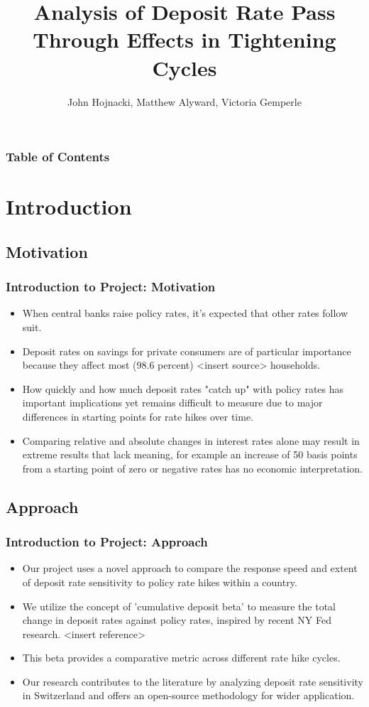 \documentclass{beamer}
\title{Analysis of Deposit Rate Pass Through Effects in Tightening Cycles}
\institute{University of Zurich}
\author{John Hojnacki, Matthew Alyward, Victoria Gemperle}
\begin{document}
\begin{frame}
\titlepage %
\end{frame}

\begin{frame}
\frametitle{Table of Contents}
\tableofcontents
\end{frame}

\section{Introduction}
\subsection{Motivation}
\begin{frame}
\frametitle{Introduction to Project: Motivation}
\begin{itemize}
  \item When central banks raise policy rates, it's expected that other rates follow suit.
  \item Deposit rates on savings for private consumers are of particular importance because they affect most (98.6 percent) <insert source> households.
  \item How quickly and how much deposit rates "catch up" with policy rates has important implications yet remains difficult to measure due to major differences in starting points for rate hikes over time.
  \item Comparing relative and absolute changes in interest rates alone may result in extreme results that lack meaning, for example an increase of 50 basis points from a starting point of zero or negative rates has no economic interpretation.
\end{itemize}
\end{frame}

\subsection{Approach}
\begin{frame}
\frametitle{Introduction to Project: Approach}
\begin{itemize}
  \item Our project uses a novel approach to compare the response speed and extent of deposit rate sensitivity to policy rate hikes within a country.
  \item We utilize the concept of 'cumulative deposit beta' to measure the total change in deposit rates against policy rates, inspired by recent NY Fed research. <insert reference>
  \item This beta provides a comparative metric across different rate hike cycles.
  \item Our research contributes to the literature by analyzing deposit rate sensitivity in Switzerland and offers an open-source methodology for wider application.
\end{itemize}
\end{frame}
\end{document}
